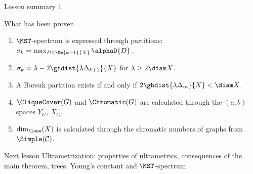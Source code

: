 \documentclass[aspectratio=169,11pt]{beamer}
\begin{document}
\begin{frame}{Lesson summary \textup{1}}
\begin{block}{What has been proven}
\begin{enumerate}
\item $\MST$-spectrum is expressed through partitions\textup{:} $\sigma_k = \max_{D \in \Dm{k+1}{X}} \alphaD{D}$.
\item $\sigma_k = \lambda - 2\ghdist{\lambda\Delta_{k+1}}{X}$ for $\lambda \ge 2\diam X$.
\item A Borsuk partition exists if and only if $2\ghdist{\lambda\Delta_m}{X} < \diam X$.
\item $\CliqueCover(G)$ and $\Chromatic(G)$ are calculated through the $(a,b)$-spaces $Y_G$, $X_G$.
\item $\dim_{\lone}(X)$ is calculated through the chromatic numbers of graphs from $\Simple(\mathcal C)$.
\end{enumerate}
\end{block}
\begin{block}{Next lesson}
Ultrametrization: properties of ultrametrics, consequences of the main theorem, trees, Young's constant and $\MST$-spectrum.
\end{block}
\end{frame}
\end{document}
